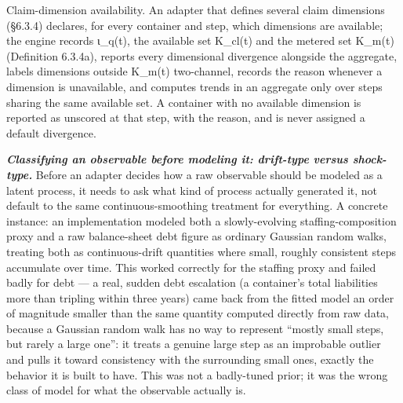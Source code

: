 \documentclass[
]{article}
\begin{document}
Claim-dimension availability. An adapter that defines several claim
dimensions (§6.3.4) declares, for every container and step, which
dimensions are available; the engine records ι\_q(t), the available set
K\_cl(t) and the metered set K\_m(t) (Definition 6.3.4a), reports every
dimensional divergence alongside the aggregate, labels dimensions
outside K\_m(t) two-channel, records the reason whenever a dimension is
unavailable, and computes trends in an aggregate only over steps sharing
the same available set. A container with no available dimension is
reported as unscored at that step, with the reason, and is never
assigned a default divergence.

\emph{\textbf{Classifying an observable before modeling it: drift-type
versus shock-type.}} Before an adapter decides how a raw observable
should be modeled as a latent process, it needs to ask what kind of
process actually generated it, not default to the same
continuous-smoothing treatment for everything. A concrete instance: an
implementation modeled both a slowly-evolving staffing-composition proxy
and a raw balance-sheet debt figure as ordinary Gaussian random walks,
treating both as continuous-drift quantities where small, roughly
consistent steps accumulate over time. This worked correctly for the
staffing proxy and failed badly for debt --- a real, sudden debt
escalation (a container's total liabilities more than tripling within
three years) came back from the fitted model an order of magnitude
smaller than the same quantity computed directly from raw data, because
a Gaussian random walk has no way to represent ``mostly small steps, but
rarely a large one'': it treats a genuine large step as an improbable
outlier and pulls it toward consistency with the surrounding small ones,
exactly the behavior it is built to have. This was not a badly-tuned
prior; it was the wrong class of model for what the observable actually
is.
\end{document}
